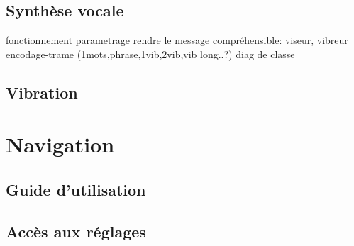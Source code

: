 \documentclass[UTF8]{EPURapport}
\begin{document}
\subsection{Synthèse vocale}
fonctionnement
parametrage
rendre le message compréhensible: viseur,
vibreur
encodage-trame (1mots,phrase,1vib,2vib,vib long..?)
diag de classe

\subsection{Vibration}

\section{Navigation}
\subsection{Guide d'utilisation}
\subsection{Accès aux réglages}

\annexes
\end{document}
